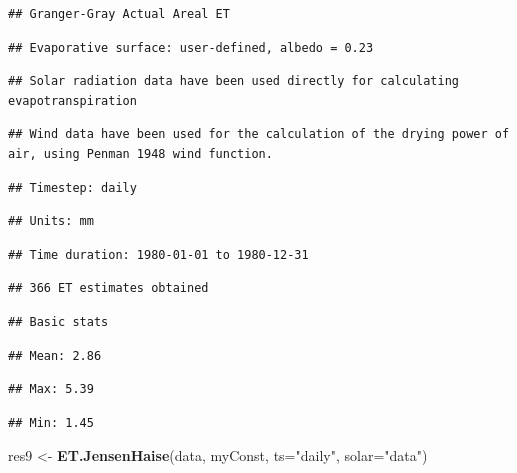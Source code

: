 \documentclass[
]{book}
\newenvironment{Shaded}{\begin{snugshade}}{\end{snugshade}}
\newcommand{\DataTypeTok}[1]{\textcolor[rgb]{0.13,0.29,0.53}{#1}}
\newcommand{\KeywordTok}[1]{\textcolor[rgb]{0.13,0.29,0.53}{\textbf{#1}}}
\newcommand{\NormalTok}[1]{#1}
\newcommand{\StringTok}[1]{\textcolor[rgb]{0.31,0.60,0.02}{#1}}
\begin{document}
\begin{verbatim}
## Granger-Gray Actual Areal ET
\end{verbatim}

\begin{verbatim}
## Evaporative surface: user-defined, albedo = 0.23
\end{verbatim}

\begin{verbatim}
## Solar radiation data have been used directly for calculating evapotranspiration
\end{verbatim}

\begin{verbatim}
## Wind data have been used for the calculation of the drying power of air, using Penman 1948 wind function.
\end{verbatim}

\begin{verbatim}
## Timestep: daily
\end{verbatim}

\begin{verbatim}
## Units: mm
\end{verbatim}

\begin{verbatim}
## Time duration: 1980-01-01 to 1980-12-31
\end{verbatim}

\begin{verbatim}
## 366 ET estimates obtained
\end{verbatim}

\begin{verbatim}
## Basic stats
\end{verbatim}

\begin{verbatim}
## Mean: 2.86
\end{verbatim}

\begin{verbatim}
## Max: 5.39
\end{verbatim}

\begin{verbatim}
## Min: 1.45
\end{verbatim}

\begin{Shaded}
\begin{Highlighting}[]
\NormalTok{res9 <-}\StringTok{ }\KeywordTok{ET.JensenHaise}\NormalTok{(data, myConst, }\DataTypeTok{ts=}\StringTok{"daily"}\NormalTok{, }\DataTypeTok{solar=}\StringTok{"data"}\NormalTok{)}
\end{Highlighting}
\end{Shaded}
\end{document}
